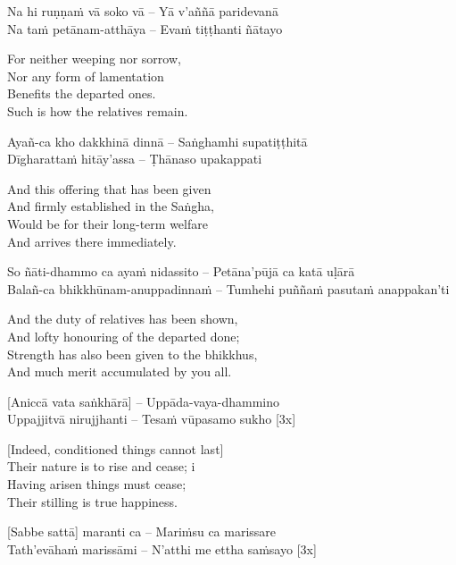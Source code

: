 Na hi ruṇṇaṁ vā soko vā – Yā v’aññā paridevanā\\
Na taṁ petānam-atthāya – Evaṁ tiṭṭhanti ñātayo

\begin{english}
  For neither weeping nor sorrow,\\
  Nor any form of lamentation\\
  Benefits the departed ones.\\
  Such is how the relatives remain.
\end{english}

Ayañ-ca kho dakkhinā dinnā – Saṅghamhi supatiṭṭhitā\\
Dīgharattaṁ hitāy’assa – Ṭhānaso upakappati

\begin{english}
  And this offering that has been given\\
  And firmly established in the Saṅgha,\\
  Would be for their long-term welfare\\
  And arrives there immediately.
\end{english}

So ñāti-dhammo ca ayaṁ nidassito – Petāna’pūjā ca katā uḷārā\\
Balañ-ca bhikkhūnam-anuppadinnaṁ – Tumhehi puññaṁ pasutaṁ anappakan’ti

\begin{english}
  And the duty of relatives has been shown,\\
  And lofty honouring of the departed done;\\
  Strength has also been given to the bhikkhus,\\
  And much merit accumulated by you all.
\end{english}

\suttaRef{[Khp 7]}

[Aniccā vata saṅkhārā] – Uppāda-vaya-dhammino\\
Uppajjitvā nirujjhanti – Tesaṁ vūpasamo sukho [3x]

\begin{english}
  [Indeed, conditioned things cannot last]\\
  Their nature is to rise and cease; i\\
  Having arisen things must cease;\\
  Their stilling is true happiness.
\end{english}

\suttaRef{[DN 16]}

[Sabbe sattā] maranti ca – Mariṁsu ca marissare\\
Tath’evāhaṁ marissāmi – N’atthi me ettha saṁsayo [3x]

